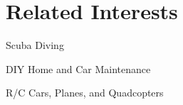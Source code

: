 \documentclass[letterpaper]{resume} %
\begin{document}
\begin{minipage}[t]{0.33\textwidth}

\section{Related Interests}
\sectionspace %
\begin{tightitemize}
    \item Scuba Diving
    \item DIY Home and Car Maintenance
    \item R/C Cars, Planes, and Quadcopters
\end{tightitemize}


\end{minipage} %
\hfill
%
%
\end{document}
